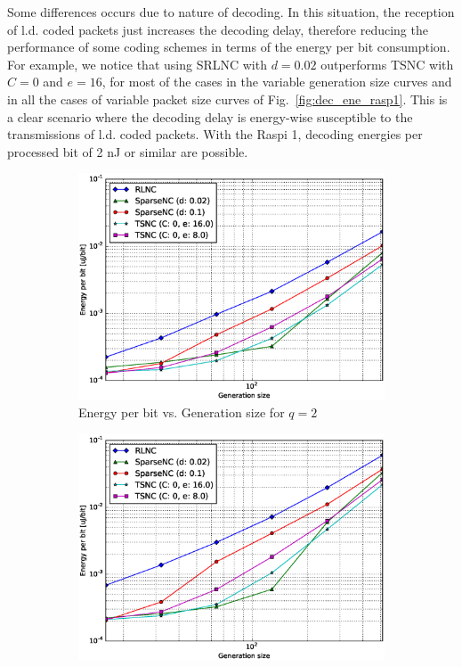 %
Some differences occurs due to nature of decoding. In this situation,
the reception of \ac{l.d.} coded packets just increases the decoding
delay, therefore reducing the performance of some coding schemes
in terms of the energy per bit consumption. For example, we notice
that using \ac{SRLNC} with $d = 0.02$ outperforms \ac{TSNC} with
$C = 0$ and $e = 16$, for most of the cases in the variable generation
size curves and in all the cases of variable packet size curves of
Fig.~\ref{fig:dec_ene_rasp1}. This is a clear scenario where the decoding
delay is energy-wise susceptible to the transmissions of \ac{l.d.}
coded packets. With the \ac{Raspi} 1, decoding energies per processed
bit of 2 nJ or similar are possible. 
%
\begin{figure}
    \centering
    \begin{subfigure}[b]{0.475\textwidth}
        \centering
        \includegraphics[width=1.05\textwidth]{images/06_06_2016/energy_per_bit_vs_generation_size_Rasp_v2_Binary_decoder_1600.eps}
        \caption[]%
        {{\small Energy per bit vs. Generation size for $q = 2$}}
        \label{fig:dec_ene_rasp2_gen_gf2}
    \end{subfigure}
    \hfill
    \begin{subfigure}[b]{0.475\textwidth}
        \centering
        \includegraphics[width=1.05\textwidth]{images/06_06_2016/energy_per_bit_vs_generation_size_Rasp_v2_Binary8_decoder_1600.eps}

\end{subfigure}
\end{figure}
